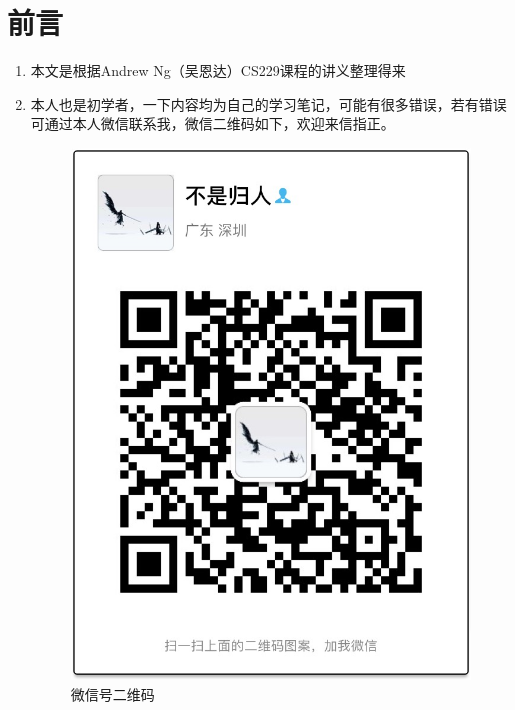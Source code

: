\section{前言}
\begin{enumerate}
	\item 本文是根据Andrew Ng（吴恩达）CS229课程的讲义整理得来
	\item 本人也是初学者，一下内容均为自己的学习笔记，可能有很多错误，若有错误可通过本人微信联系我，微信二维码如下，欢迎来信指正。
	\begin{figure}[htbp]
		\centering
		\includegraphics[scale=0.25]{images/微信号二维码}
		\caption{微信号二维码}
	\end{figure}
\end{enumerate}



























